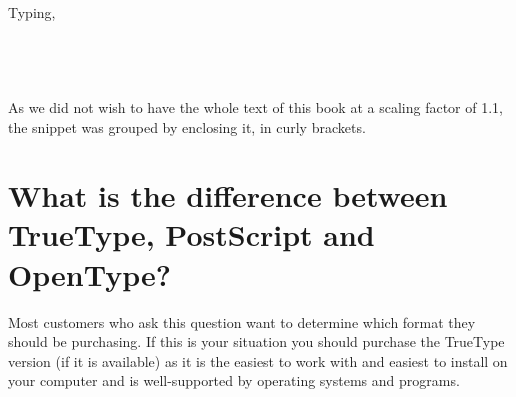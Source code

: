\begin{multicols}{2}
\begin{teXXX}



\DeclareRobustCommand\scalefont[1]{%
  \dimen@\z@
  \dimen@ii\z@
  \afterassignment\@scalefont
              \@tempdima\the\baselineskip\relax\relax\relax\relax\relax
  \skip@#1\@tempdima\@plus#1\dimen@\@minus#1\dimen@ii
  \dimen@\f@size\p@
  \dimen@#1\dimen@
  \fontsize\dimen@\skip@\selectfont}

\def\@scalefont#1#2#3#4#5{%
 \if#1p%
    \afterassignment\@scalefont\dimen@#5%
 \else
   \if#1m%
     \dimen@ii
   \fi
  \fi}

\end{teXXX}




Typing,

\begin{teX}
{\texttt{ \lorem}}
\end{teX}

\topline
{\texttt{ \lorem}}
\bottomline

As we did not wish to have the whole text of this book at a scaling factor of 1.1, the snippet was grouped by enclosing it, in curly brackets. 


\section{What is the difference between TrueType, PostScript and OpenType?}

Most customers who ask this question want to determine which format they should be purchasing. If this is your situation you should purchase the TrueType version (if it is available) as it is the easiest to work with and easiest to install on your computer and is well-supported by operating systems and programs.


\end{multicols}
